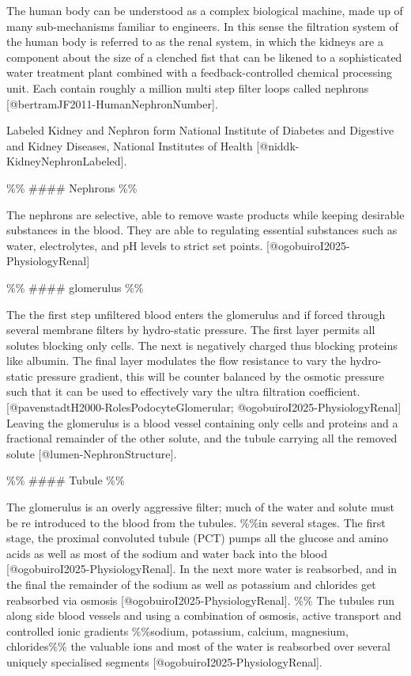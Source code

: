 \documentclass[
  paper=a4,
  ,captions=tableheading
]{scrartcl}
\renewenvironment{quote}{\begin{customblockquote}\list{}{\rightmargin=0em\leftmargin=0em}%
\item\relax\color{blockquote-text}\ignorespaces}{\unskip\unskip\endlist\end{customblockquote}}
\begin{document}
The human body can be understood as a complex biological machine, made
up of many sub-mechanisms familiar to engineers. In this sense the
filtration system of the human body is referred to as the renal system,
in which the kidneys are a component about the size of a clenched fist
that can be likened to a sophisticated water treatment plant combined
with a feedback-controlled chemical processing unit. Each contain
roughly a million multi step filter loops called nephrons
{[}@bertramJF2011-HumanNephronNumber{]}.

\begin{quote}
{} Labeled Kidney and Nephron form National Institute of Diabetes and
Digestive and Kidney Diseases, National Institutes of Health
{[}@niddk-KidneyNephronLabeled{]}.
\end{quote}

\%\% \#\#\#\# Nephrons \%\%

The nephrons are selective, able to remove waste products while keeping
desirable substances in the blood. They are able to regulating essential
substances such as water, electrolytes, and pH levels to strict set
points. {[}@ogobuiroI2025-PhysiologyRenal{]}

\%\% \#\#\#\# glomerulus \%\%

The the first step unfiltered blood enters the glomerulus and if forced
through several membrane filters by hydro-static pressure. The first
layer permits all solutes blocking only cells. The next is negatively
charged thus blocking proteins like albumin. The final layer modulates
the flow resistance to vary the hydro-static pressure gradient, this
will be counter balanced by the osmotic pressure such that it can be
used to effectively vary the ultra filtration coefficient.
{[}@pavenstadtH2000-RolesPodocyteGlomerular;
@ogobuiroI2025-PhysiologyRenal{]} Leaving the glomerulus is a blood
vessel containing only cells and proteins and a fractional remainder of
the other solute, and the tubule carrying all the removed solute
{[}@lumen-NephronStructure{]}.

\%\% \#\#\#\# Tubule \%\%

The glomerulus is an overly aggressive filter; much of the water and
solute must be re introduced to the blood from the tubules. \%\%in
several stages. The first stage, the proximal convoluted tubule (PCT)
pumps all the glucose and amino acids as well as most of the sodium and
water back into the blood {[}@ogobuiroI2025-PhysiologyRenal{]}. In the
next more water is reabsorbed, and in the final the remainder of the
sodium as well as potassium and chlorides get reabsorbed via osmosis
{[}@ogobuiroI2025-PhysiologyRenal{]}. \%\% The tubules run along side
blood vessels and using a combination of osmosis, active transport and
controlled ionic gradients \%\%sodium, potassium, calcium, magnesium,
chlorides\%\% the valuable ions and most of the water is reabsorbed over
several uniquely specialised segments
{[}@ogobuiroI2025-PhysiologyRenal{]}.
\end{document}
